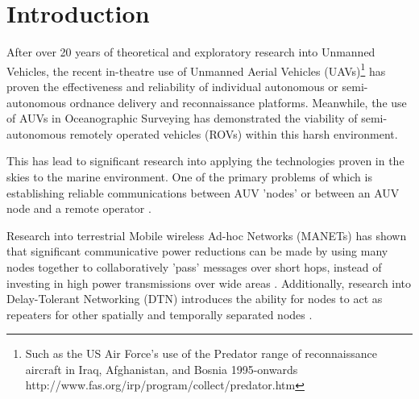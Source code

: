 \documentclass[twoside,10pt,a4paper]{Latex/Classes/PhDthesisPSnPDF}
\begin{document}

\setcounter{secnumdepth}{3} %
\setcounter{tocdepth}{1}    %
\tableofcontents            %


\mainmatter

\renewcommand{\chaptername}{} %

\chapter{Introduction} After over 20 years of theoretical and exploratory
research into Unmanned Vehicles, the recent
in-theatre use of Unmanned Aerial Vehicles (UAVs)\footnote{Such as the US Air
Force's use of the Predator range of reconnaissance aircraft in Iraq, 
Afghanistan, and Bosnia 1995-onwards 
http://www.fas.org/irp/program/collect/predator.htm} has proven the 
effectiveness and reliability of individual
autonomous or semi-autonomous ordnance delivery and reconnaissance platforms.
Meanwhile, the use of AUVs in Oceanographic Surveying has demonstrated the
viability of semi-autonomous remotely operated vehicles (ROVs) within this 
harsh environment. 
	
This has lead to significant research into applying the technologies proven in
the skies to the marine environment. One of the primary problems of which is 
establishing reliable communications between AUV 'nodes' or between an AUV node 
and a remote operator \cite{Partan2006}.

Research into terrestrial Mobile wireless Ad-hoc Networks (MANETs) has shown 
that significant communicative power reductions can be made by using
many nodes together to collaboratively 'pass' messages over short hops, instead
of investing in high power transmissions over wide areas \cite{Royer1999}.
Additionally, research into Delay-Tolerant Networking (DTN) introduces the
ability for nodes to act as repeaters for other spatially and temporally
separated nodes \cite{Fall2003}.
\end{document}
